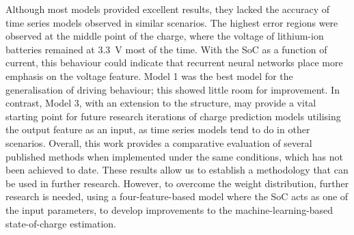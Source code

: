 %
%
Although most models provided excellent results, they lacked the accuracy of time series models observed in similar scenarios.
The highest error regions were observed at the middle point of the charge, where the voltage of lithium-ion batteries remained at 3.3~V most of the time.
With the SoC as a function of current, this behaviour could indicate that recurrent neural networks place more emphasis on the voltage feature.
Model 1 was the best model for the generalisation of driving behaviour; this showed little room for improvement.
In contrast, Model 3, with an extension to the structure, may provide a vital starting point for future research iterations of charge prediction models utilising the output feature as an input, as time series models tend to do in other scenarios.
Overall, this work provides a comparative evaluation of several published methods when implemented under the same conditions, which has not been achieved to date.
These results allow us to establish a methodology that can be used in further research.
However, to overcome the weight distribution, further research is needed, using a four-feature-based model where the SoC acts as one of the input parameters, to develop improvements to the machine-learning-based state-of-charge estimation.
